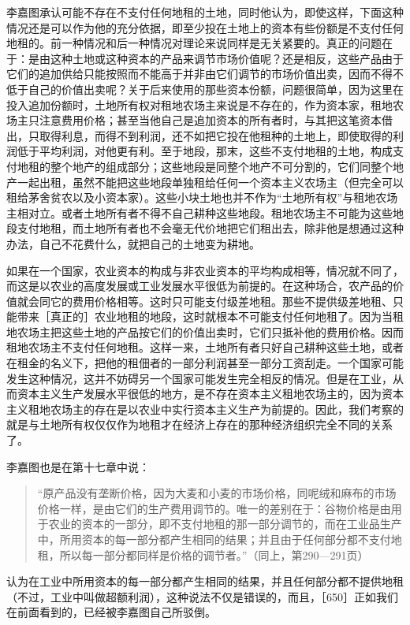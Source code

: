 李嘉图承认可能不存在不支付任何地租的土地，同时他认为，即使这样，下面这种情况还是可以作为他的充分依据，即至少投在土地上的资本有些份额是不支付任何地租的。前一种情况和后一种情况对理论来说同样是无关紧要的。真正的问题在于：是由这种土地或这种资本的产品来调节市场价值呢？还是相反，这些产品由于它们的追加供给只能按照而不能高于并非由它们调节的市场价值出卖，因而不得不低于自己的价值出卖呢？关于后来使用的那些资本份额，问题很简单，因为这里在投入追加份额时，土地所有权对租地农场主来说是不存在的，作为资本家，租地农场主只注意费用价格；甚至当他自己是追加资本的所有者时，与其把这笔资本借出，只取得利息，而得不到利润，还不如把它投在他租种的土地上，即使取得的利润低于平均利润，对他更有利。至于地段，那末，这些不支付地租的土地，构成支付地租的整个地产的组成部分；这些地段是同整个地产不可分割的，它们同整个地产一起出租，虽然不能把这些地段单独租给任何一个资本主义农场主（但完全可以租给茅舍贫农以及小资本家）。这些小块土地也并不作为“土地所有权”与租地农场主相对立。或者土地所有者不得不自己耕种这些地段。租地农场主不可能为这些地段支付地租，而土地所有者也不会毫无代价地把它们租出去，除非他是想通过这种办法，自己不花费什么，就把自己的土地变为耕地。

如果在一个国家，农业资本的构成与非农业资本的平均构成相等，情况就不同了，而这是以农业的高度发展或工业发展水平很低为前提的。在这种场合，农产品的价值就会同它的费用价格相等。这时只可能支付级差地租。那些不提供级差地租、只能带来［真正的］农业地租的地段，这时就根本不可能支付任何地租了。因为当租地农场主把这些土地的产品按它们的价值出卖时，它们只抵补他的费用价格。因而租地农场主不支付任何地租。这样一来，土地所有者只好自己耕种这些土地，或者在租金的名义下，把他的租佃者的一部分利润甚至一部分工资刮走。一个国家可能发生这种情况，这并不妨碍另一个国家可能发生完全相反的情况。但是在工业，从而资本主义生产发展水平很低的地方，是不存在资本主义租地农场主的，因为资本主义租地农场主的存在是以农业中实行资本主义生产为前提的。因此，我们考察的就是与土地所有权仅仅作为地租才在经济上存在的那种经济组织完全不同的关系了。

李嘉图也是在第十七章中说：

\begin{quote}{“原产品没有垄断价格，因为大麦和小麦的市场价格，同呢绒和麻布的市场价格一样，是由它们的生产费用调节的。唯一的差别在于：谷物价格是由用于农业的资本的一部分，即不支付地租的那一部分调节的，而在工业品生产中，所用资本的每一部分都产生相同的结果；并且由于任何部分都不支付地租，所以每一部分都同样是价格的调节者。”（同上，第290—291页）}\end{quote}

认为在工业中所用资本的每一部分都产生相同的结果，并且任何部分都不提供地租（不过，工业中叫做超额利润），这种说法不仅是错误的，而且，［650］正如我们在前面看到的，已经被李嘉图自己所驳倒。

